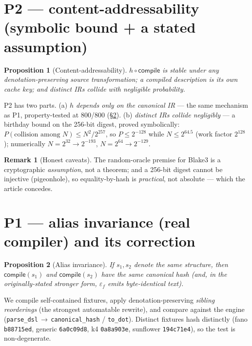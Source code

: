 \documentclass[11pt]{article}
\newtheorem{proposition}{Proposition}
\theoremstyle{definition}
\newtheorem{remark}{Remark}
\begin{document}


\section{P2 --- content-addressability (symbolic bound + a stated assumption)}
\label{sec:p2}

\begin{proposition}[Content-addressability]
$h\circ\mathsf{compile}$ is stable under any denotation-preserving source transformation; a compiled description
is its own cache key; and distinct IRs collide with negligible probability.
\end{proposition}

P2 has two parts. (a) \emph{$h$ depends only on the canonical IR} --- the same mechanism as P1, property-tested
at 800/800 (\S\ref{sec:p1}). (b) \emph{distinct IRs collide negligibly} --- a birthday bound on the 256-bit
digest, proved symbolically: $P(\text{collision among }N) \le N^2/2^{257}$, so $P\le2^{-128}$ while
$N\le2^{64.5}$ (work factor $2^{128}$); numerically $N{=}2^{32}\!\to\!2^{-193}$, $N{=}2^{64}\!\to\!2^{-129}$.

\begin{remark}[Honest caveats]
The random-oracle premise for Blake3 is a cryptographic \emph{assumption}, not a theorem; and a 256-bit digest
cannot be injective (pigeonhole), so equality-by-hash is \emph{practical}, not absolute --- which the article
concedes.
\end{remark}



\section{P1 --- alias invariance (real compiler) and its correction}
\label{sec:p1}

\begin{proposition}[Alias invariance]
If $s_1,s_2$ denote the same structure, then $\mathsf{compile}(s_1)$ and $\mathsf{compile}(s_2)$ have the same
canonical hash (and, in the originally-stated stronger form, $\varepsilon_f$ emits byte-identical text).
\end{proposition}

We compile self-contained fixtures, apply denotation-preserving \emph{sibling reorderings} (the strongest
automatable rewrite), and compare against the engine (\texttt{parse\_dsl}\,$\to$\,\texttt{canonical\_hash} /
\texttt{to\_dot}). Distinct fixtures hash distinctly (fano \texttt{b88715ed}, generic \texttt{6a0c09d8}, k4
\texttt{0a8a903e}, sunflower \texttt{194c71e4}), so the test is non-degenerate.
\end{document}
